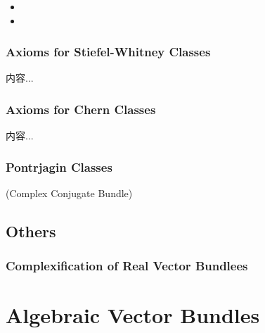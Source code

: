 \documentclass[Total.tex]{subfiles}
\begin{document}
	\begin{itemize}
		\item 
		\item 
	\end{itemize}
	
	\subsubsection{Axioms for Stiefel-Whitney Classes}
	
	\begin{axiom}
		内容...
	\end{axiom}
	
	\subsubsection{Axioms for Chern Classes}
	
	\begin{axiom}
		内容...
	\end{axiom}
	\subsubsection{Pontrjagin Classes}
	
	\begin{Def}
		(Complex Conjugate Bundle) 
	\end{Def}
	
	\subsection{Others}
	\subsubsection{Complexification of Real Vector Bundlees}
	\section{Algebraic Vector Bundles}
\end{document}
